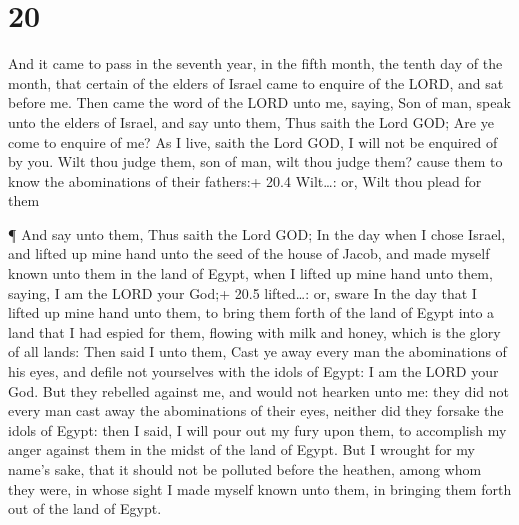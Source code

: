 \hypertarget{section-19}{%
\section{20}\label{section-19}}

 And it came to pass in the seventh year, in the fifth
month, the tenth day of the month, that certain of the elders of Israel
came to enquire of the LORD, and sat before me.  Then came
the word of the LORD unto me, saying,  Son of man, speak
unto the elders of Israel, and say unto them, Thus saith the Lord GOD;
Are ye come to enquire of me? As I live, saith the Lord GOD, I will not
be enquired of by you.  Wilt thou judge them, son of man,
wilt thou judge them? cause them to know the abominations of their
fathers:+ 20.4 Wilt\ldots: or, Wilt thou plead for them

 ¶ And say unto them, Thus saith the Lord GOD; In the day
when I chose Israel, and lifted up mine hand unto the seed of the house
of Jacob, and made myself known unto them in the land of Egypt, when I
lifted up mine hand unto them, saying, I am the LORD your God;+ 20.5
lifted\ldots: or, sware  In the day that I lifted up mine
hand unto them, to bring them forth of the land of Egypt into a land
that I had espied for them, flowing with milk and honey, which is the
glory of all lands:  Then said I unto them, Cast ye away
every man the abominations of his eyes, and defile not yourselves with
the idols of Egypt: I am the LORD your God.  But they
rebelled against me, and would not hearken unto me: they did not every
man cast away the abominations of their eyes, neither did they forsake
the idols of Egypt: then I said, I will pour out my fury upon them, to
accomplish my anger against them in the midst of the land of Egypt.
 But I wrought for my name's sake, that it should not be
polluted before the heathen, among whom they were, in whose sight I made
myself known unto them, in bringing them forth out of the land of Egypt.

